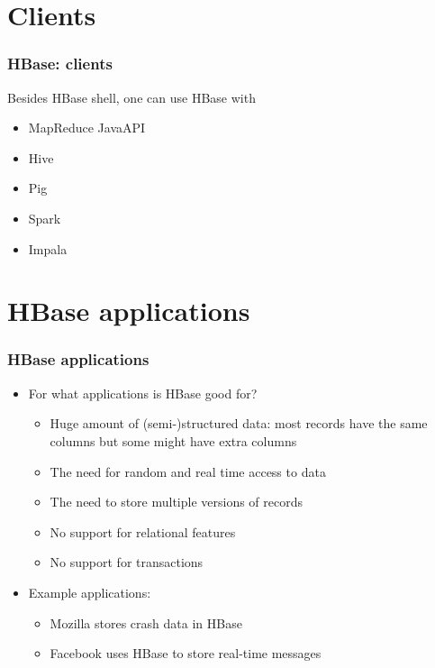 \documentclass{beamer}
\begin{document}
\section{Clients}
\begin{frame}
 \frametitle{HBase: clients}
 Besides HBase shell, one can use HBase with
 \begin{itemize}
  \item MapReduce JavaAPI
  \item Hive
  \item Pig
  \item Spark
  \item Impala
  \end{itemize}
\end{frame}


\section{HBase applications}
\begin{frame}
  \frametitle{HBase applications}
  \begin{itemize}
    \item For what applications is HBase good for?
      \begin{itemize}
      \item Huge amount of (semi-)structured data: most records have the same columns but some might have extra columns
      \item The need for random and real time access to data
      \item The need to store multiple versions of records
      \item No support for relational features
      \item No support for transactions
      \end{itemize}
    \item Example applications:
      \begin{itemize}
      \item  Mozilla stores crash data in HBase
      \item Facebook uses HBase to store real-time messages
      \end{itemize}
  \end{itemize}
\end{frame}
\end{document}
